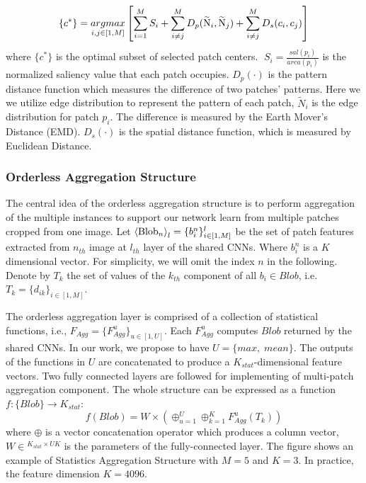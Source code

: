 \documentclass[10pt,twocolumn,letterpaper]{article}
\begin{document}
\[\{ {c^ * }\}  = \mathop {argmax}\limits_{i,j \in [1,M]} \left[ {\sum\limits_{i = 1}^M {{S_i}}  + \sum\limits_{i \ne j}^M {{D_p}({{\widetilde {\rm N}}_i},{{\widetilde {\rm N}}_j}) + \sum\limits_{i \ne j}^M {{D_s}({c_i},{c_j})} } } \right]\]
where $\{ {c^ * }\} $ is the optimal subset of selected patch centers. $\;{S_i} = \frac{{sal({p_i})}}{{area({p_i})}}$ is the normalized saliency value that 
each patch occupies. ${D_p}( \cdot )$ is the pattern distance function which 
measures the difference of two patches' patterns. Here we we utilize 
edge distribution to represent the pattern of each patch, ${{\tilde N}_i}$ 
is the edge distribution for patch $p_i$. The difference is measured by the 
Earth Mover's Distance (EMD). ${D_s}( \cdot )$ is the spatial distance function, which is measured by Euclidean Distance.



\subsubsection{Orderless Aggregation Structure}
The central idea of the orderless aggregation structure is to perform 
aggregation of the multiple instances to support our network learn from multiple 
patches cropped from one image.
Let ${\left\langle {{\rm{Blo}}{{\rm{b}}_n}} \right\rangle _{l}} = \{ b_i^n\} _{i \in [1,M]}^{l}$ be the set of patch features extracted from $n_{th}$ image 
at $l_{th}$ layer of the shared CNNs. Where $b_i^n$ is a $K$ dimensional vector.
For simplicity, we will omit the index $n$ in the following. 
Denote by $T_k$ the set of values
of the $k_{th}$ component of all ${b_i} \in Blob$, i.e. ${T_k} = {\{ {d_{ik}}\} _{i \in [1,M]}}$.

The orderless aggregation layer is comprised of a collection of statistical functions, 
i.e., ${F_{Agg}} = {\{ F_{Agg}^u\} _{u \in [1,U]}}$. Each $F_{Agg}^u$ computes
$Blob$ returned by the shared CNNs. In our work, we propose to have $U = \{ max,\;mean\} $. 
The outputs of the functions in $U$ are concatenated to produce a ${K_{stat}}$-dimensional feature vectors. Two fully connected layers are followed for implementing of multi-patch
aggregation component. The whole structure can be expressed as a function 
$f:\{ Blob\}  \to {{{K_{stat}}}}$:
\[f(Blob) = W \times ( \oplus _{u = 1}^U \oplus _{k = 1}^KF_{Agg}^u({T_k}))\]
where $ \oplus$ is a vector concatenation operator which produces a column vector, $W \in {^{{K_{stat}} \times UK}}$ is the parameters of the fully-connected layer. 
The figure shows an example of Statistics Aggregation Structure with $M = 5$ and $K=3$. In practice, the feature
dimension $K=4096$.
\end{document}
